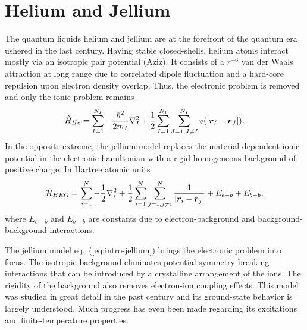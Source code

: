 \section{Helium and Jellium}
The quantum liquids helium and jellium are at the forefront of the quantum era ushered in the last century.
Having stable closed-shells, helium atoms interact mostly via an isotropic pair potential (Aziz). It consists of a $r^{-6}$ van der Waals attraction at long range due to correlated dipole fluctuation and a hard-core repulsion upon electron density overlap.
Thus, the electronic problem is removed and only the ionic problem remains
\begin{align}
\hat{H}_{He} = \sum\limits_{I=1}^{N_I} -\dfrac{\hbar^2}{2m_I}\nabla_I^2
+\frac{1}{2}\sum\limits_{I=1}^{N_I}\sum\limits_{J=1,J\neq I}^{N_I} v(\vert\boldsymbol{r}_I-\boldsymbol{r}_J\vert).
\end{align}
In the opposite extreme, the jellium model replaces the material-dependent ionic potential in the electronic hamiltonian with a rigid homogeneous background of positive charge. In Hartree atomic units
\begin{align} \label{eq:intro-jellium}
\hat{\mathcal{H}}_{HEG} = \sum\limits_{i=1}^N -\dfrac{1}{2}\nabla_i^2 + \frac{1}{2}\sum\limits_{i=1}^N\sum\limits_{j=1,j\neq i}^N
\dfrac{1}{\vert \boldsymbol{r}_i-\boldsymbol{r}_j \vert}
+E_{e-b}+E_{b-b},
\end{align}
where $E_{e-b}$ and $E_{b-b}$ are constants due to electron-background and background-background interactions.

The jellium model eq.~(\ref{eq:intro-jellium}) brings the electronic problem into focus. The isotropic background eliminates potential symmetry breaking interactions that can be introduced by a crystalline arrangement of the ions. The rigidity of the background also removes electron-ion coupling effects. This model was studied in great detail in the past century and its ground-state behavior is largely understood. Much progress has even been made regarding its excitations and finite-temperature properties.

